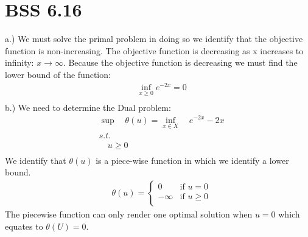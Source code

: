 \documentclass[12pt]{article}
\begin{document}
\section{BSS 6.16}
    a.) We must solve the primal problem in doing so we identify that the objective function is non-increasing. The objective function is decreasing as x increases to infinity: $x \rightarrow \infty$. Because the objective function is decreasing we must find the lower bound of the function:\\
        \begin{align*}
            &\inf_{x\geq0} e^{-2x} = 0\\
        \end{align*}
    b.) We need to determine the Dual problem:\\
        \begin{align*}
            &\sup \quad \theta (u) = \inf_{x \in X} \quad e^{-2x} -2x \\
            &s.t.\\
            &\quad u\geq 0\\
        \end{align*}
    We identify that $\theta (u) $ is a piece-wise function in which we identify a lower bound. \\
        \begin{align*}
            &\theta(u) = 
                \begin{cases} 
                    0 & \text{if } u = 0\\
                    -\infty & \text{if } u \geq 0 \\
                \end{cases}
        \end{align*}
    The piecewise function can only render one optimal solution when $u=0$ which equates to $\theta (U) = 0 $. 
\end{document}
